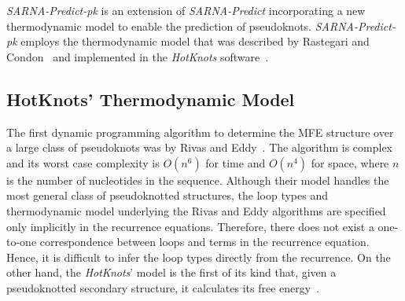 \documentclass{doublecol-new}
\theoremstyle{TH}{
\newtheorem{lemma}{Lemma}
\newtheorem{theorem}[lemma]{Theorem}
\newtheorem{corrolary}[lemma]{Corrolary}
\newtheorem{conjecture}[lemma]{Conjecture}
\newtheorem{proposition}[lemma]{Proposition}
\newtheorem{claim}[lemma]{Claim}
\newtheorem{stheorem}[lemma]{Wrong Theorem}
\newtheorem{algorithm}{Algorithm}
}
\theoremstyle{THrm}{
\newtheorem{definition}{Definition}
\newtheorem{question}{Question}
\newtheorem{remark}{Remark}
\newtheorem{scheme}{Scheme}
}
\theoremstyle{THhit}{
\newtheorem{case}{Case}[section]
}
\begin{document}
{\em SARNA-Predict-pk} is an extension of {\em SARNA-Predict} incorporating
a new thermodynamic model to enable the prediction of pseudoknots.
{\em SARNA-Predict-pk} employs
the thermodynamic model that was described by Rastegari and
Condon~\cite{DBLP:conf/wabi/RastegariC05} and implemented in the
{\em HotKnots} software~\cite{ren_2005}.


\subsection{HotKnots' Thermodynamic Model}
\label{subsubsection:HotKnots} The first dynamic programming
algorithm to determine the MFE structure over a large class of
pseudoknots was by Rivas and Eddy~\cite{rivas99dynamic}.  The
algorithm is complex and its worst case complexity is $O(n^6)$ for
time and $O(n^4)$ for space, where $n$ is the number of nucleotides in the sequence.
Although their model handles the most
general class of pseudoknotted structures, the loop types and
thermodynamic model underlying the Rivas and Eddy algorithms are
specified only implicitly in the recurrence equations.  Therefore,
there does not exist a one-to-one correspondence between loops and
terms in the recurrence equation. Hence, it is difficult to infer
the loop types directly from the recurrence. On the other hand, the
{\em HotKnots}' model is the first of its kind that, given a
pseudoknotted secondary structure, it calculates its free
energy~\cite{DBLP:conf/wabi/RastegariC05}.
\end{document}
